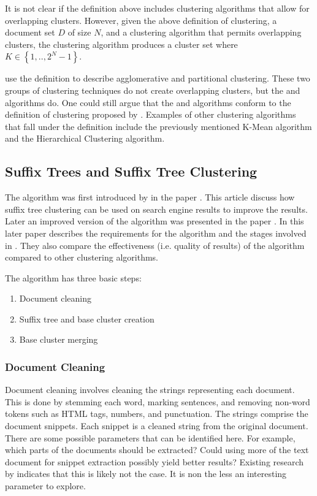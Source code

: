 It is not clear if the definition above includes clustering algorithms that allow for overlapping clusters. However, given the above definition of clustering, a document set \(D\) of size \(N\), and a clustering algorithm that permits overlapping clusters, the clustering algorithm produces a cluster set where \(K \in \left\{1, .., 2^{N}-1\right\}\).

 \citeauthor{Baeza-Yates2011a} use the definition to describe agglomerative and partitional clustering. These two groups of clustering techniques do not create overlapping clusters, but the \STC and \CTC algorithms do. One could still argue that the \STC and \CTC algorithms conform to the definition of clustering proposed by \citeauthor{Baeza-Yates2011a}. Examples of other clustering algorithms that fall under the definition include the previously mentioned K-Mean algorithm and the Hierarchical Clustering algorithm.

\subsection{Suffix Trees and Suffix Tree Clustering}
The \STC algorithm was first introduced by \textcite{Oren1997} in the paper . This article discuss how suffix tree clustering can be used on search engine results to improve the results. Later an improved version of the algorithm was presented in the paper  \cite{Oren1998}. In this later paper \citeauthor{Oren1998} describes the requirements for the \STC algorithm and the stages involved in \STC. They also compare the effectiveness (i.e. quality of results) of the algorithm compared to other clustering algorithms.

The \STC algorithm has three basic steps:
\begin{enumerate}
\item Document cleaning
\item Suffix tree and base cluster creation
\item Base cluster merging
\end{enumerate}

\subsubsection{Document Cleaning}

Document cleaning involves cleaning the strings representing each document. This is done by stemming each word, marking sentences, and removing non-word tokens such as HTML tags, numbers, and punctuation. The strings comprise the document snippets. Each snippet is a cleaned string from the original document. There are some possible parameters that can be identified here. For example, which parts of the documents should be extracted? Could using more of the text document for snippet extraction possibly yield better results? Existing research by \cite{Oren1998} indicates that this is likely not the case. It is non the less an interesting parameter to explore.

